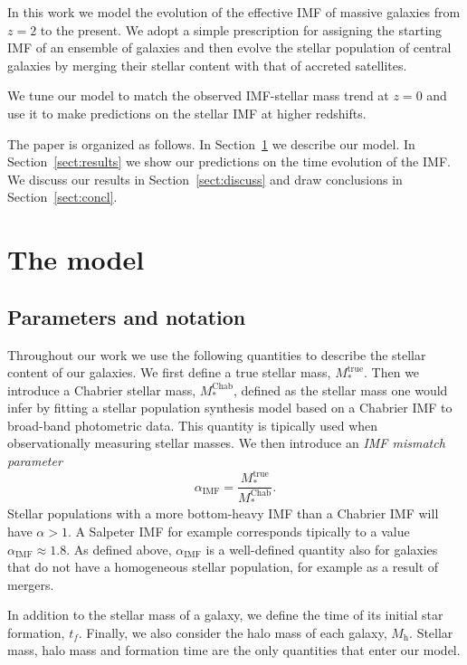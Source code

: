 \documentclass{emulateapj}
\def\mhalo{M_{\mathrm{h}}}
\def\mtrue{M_*^{\mathrm{true}}}
\def\mchab{M_*^{\mathrm{Chab}}}
\def\aimf{\alpha_{\mathrm{IMF}}}
\def\Sref#1{Section~\ref{#1}\xspace}
\begin{document}
In this work we model the evolution of the effective IMF of massive galaxies from $z=2$ to the present.
We adopt a simple prescription for assigning the starting IMF of an ensemble of galaxies and then evolve the stellar population of central galaxies by merging their stellar content with that of accreted satellites.

We tune our model to match the observed IMF-stellar mass trend at $z=0$ and use it to make predictions on the stellar IMF at higher redshifts.

The paper is organized as follows.  In \Sref{sect:model} we describe our model.
In \Sref{sect:results} we show our predictions on the time evolution of the IMF.
We discuss our results in \Sref{sect:discuss} and draw conclusions in \Sref{sect:concl}.


\section{The model}\label{sect:model}

\subsection{Parameters and notation}
Throughout our work we use the following quantities to describe the stellar content of our galaxies. We first define a true stellar mass, $\mtrue$. Then we introduce a Chabrier stellar mass, $\mchab$, defined as the stellar mass one would infer by fitting a stellar population synthesis model based on a Chabrier IMF to broad-band photometric data. This quantity is tipically used when observationally measuring stellar masses.
We then introduce an {\em IMF mismatch parameter}
\begin{equation}\label{eq:aimf}
\aimf = \frac{\mtrue}{\mchab}.
\end{equation}
Stellar populations with a more bottom-heavy IMF than a Chabrier IMF will have $\alpha>1$. A Salpeter IMF for example corresponds tipically to a value $\aimf\approx1.8$.
As defined above, $\aimf$ is a well-defined quantity also for galaxies that do not have a homogeneous stellar population, for example as a result of mergers.

In addition to the stellar mass of a galaxy, we define the time of its initial star formation, $t_f$. 
Finally, we also consider the halo mass of each galaxy, $\mhalo$.
Stellar mass, halo mass and formation time are the only quantities that enter our model.
\end{document}
